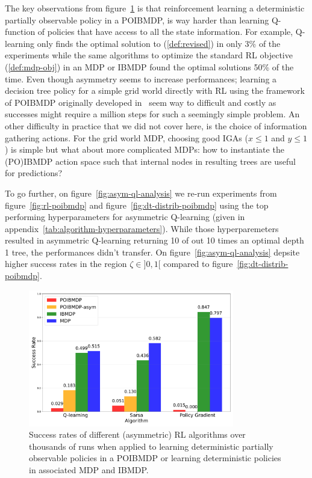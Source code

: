 The key observations from figure~\ref{fig:po-vs-ib} is that reinforcement learning a deterministic partially observable policy in a POIBMDP, is way harder than learning Q-function of policies that have access to all the state information.
For example, Q-learning only finds the optimal solution to (\ref{def:revised}) in only 3\% of the experiments while the same algorithms to optimize the standard RL objective (\ref{def:mdp-obj}) in an MDP or IBMDP found the optimal solutions 50\% of the time.
Even though asymmetry seems to increase performances; learning a decision tree policy for a simple grid world directly with RL using the framework of POIBMDP originally developed in~\cite{topin2021iterative} seem way to difficult and costly as successes might require a million steps for such a seemingly simple problem.
An other difficulty in practice that we did not cover here, is the choice of information gathering actions.
For the grid world MDP, choosing good IGAs ($x\leq1$ and $y\leq1$) is simple but what about more complicated MDPs: how to instantiate the (PO)IBMDP action space such that internal nodes in resulting trees are useful for predictions?

To go further, on figure~\ref{fig:asym-ql-analysis} we re-run experiments from figure~\ref{fig:rl-poibmdp} and figure~\ref{fig:dt-distrib-poibmdp} using the top performing hyperparameters for asymmetric Q-learning (given in appendix~\ref{tab:algorithm-hyperparameters}).
While those hyperparemeters resulted in asymmetric Q-learning returning 10 of out 10 times an optimal depth 1 tree,
the performances didn't transfer.
On figure~\ref{fig:asym-ql-analysis} depsite higher success rates in the region $\zeta\in]0,1[$ compared to figure~\ref{fig:dt-distrib-poibmdp}. 

\begin{figure}
    \centering
    \includegraphics[width=0.8\textwidth]{images/images_part1/algorithm_performance_comparison_flattened.pdf}
    \caption{Success rates of different (asymmetric) RL algorithms over thousands of runs when applied to learning deterministic partially observable policies in a POIBMDP or learning deterministic policies in associated MDP and IBMDP.}\label{fig:po-vs-ib}
\end{figure}


